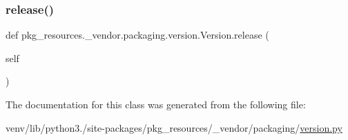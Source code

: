 \subsubsection{\texorpdfstring{release()}{release()}}
{\footnotesize\ttfamily def pkg\+\_\+resources.\+\_\+vendor.\+packaging.\+version.\+Version.\+release (\begin{DoxyParamCaption}\item[{}]{self }\end{DoxyParamCaption})}



The documentation for this class was generated from the following file\+:\begin{DoxyCompactItemize}
\item 
venv/lib/python3./site-\/packages/pkg\+\_\+resources/\+\_\+vendor/packaging/\hyperlink{pkg__resources_2__vendor_2packaging_2version_8py}{version.\+py}\end{DoxyCompactItemize}
